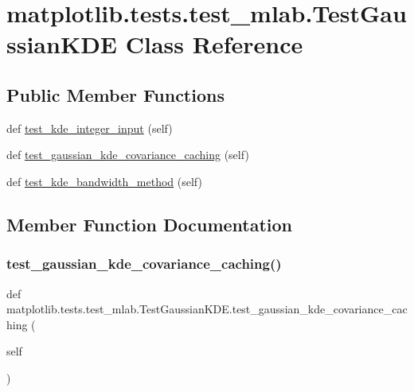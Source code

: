 \hypertarget{classmatplotlib_1_1tests_1_1test__mlab_1_1TestGaussianKDE}{}\section{matplotlib.\+tests.\+test\+\_\+mlab.\+Test\+Gaussian\+K\+DE Class Reference}
\label{classmatplotlib_1_1tests_1_1test__mlab_1_1TestGaussianKDE}
\subsection*{Public Member Functions}
\begin{DoxyCompactItemize}
\item 
def \hyperlink{classmatplotlib_1_1tests_1_1test__mlab_1_1TestGaussianKDE_a29af2ee291b9f5509af672db63209ecd}{test\+\_\+kde\+\_\+integer\+\_\+input} (self)
\item 
def \hyperlink{classmatplotlib_1_1tests_1_1test__mlab_1_1TestGaussianKDE_a720d3f618660bdb643df3fdc0ae805ae}{test\+\_\+gaussian\+\_\+kde\+\_\+covariance\+\_\+caching} (self)
\item 
def \hyperlink{classmatplotlib_1_1tests_1_1test__mlab_1_1TestGaussianKDE_ad787458c6ab5c268b0be95dce4ec1140}{test\+\_\+kde\+\_\+bandwidth\+\_\+method} (self)
\end{DoxyCompactItemize}


\subsection{Member Function Documentation}
\mbox{\label{classmatplotlib_1_1tests_1_1test__mlab_1_1TestGaussianKDE_a720d3f618660bdb643df3fdc0ae805ae}} 
\subsubsection{\texorpdfstring{test\+\_\+gaussian\+\_\+kde\+\_\+covariance\+\_\+caching()}{test\_gaussian\_kde\_covariance\_caching()}}
{\footnotesize\ttfamily def matplotlib.\+tests.\+test\+\_\+mlab.\+Test\+Gaussian\+K\+D\+E.\+test\+\_\+gaussian\+\_\+kde\+\_\+covariance\+\_\+caching (\begin{DoxyParamCaption}\item[{}]{self }\end{DoxyParamCaption})}

